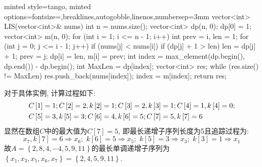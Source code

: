 \documentclass{article}
\begin{document}
\begin{homeworkProblem}
\begin{tcblisting}
{minted style=tango,
minted options={fontsize=\small,breaklines,autogobble,linenos,numbersep=3mm}}
vector<int> LIS(vector<int>& nums) {
    int n = nums.size();
    vector<int> dp(n, 0);
    dp[0] = 1;
    vector<int> m(n, 0); 
    for (int i = 1; i <= n - 1; i++) {
        int prev = i, len = 1; 
        for (int j = 0; j <= i - 1; j++) {
            if (nums[j] < nums[i]) { 
                if (dp[j] + 1 > len) {
                    len = dp[j] + 1;
                    prev = j;
                }
            }
        }
        dp[i] = len, m[i] = prev; 
    }
    int index = max_element(dp.begin(), dp.end()) - dp.begin(); 
    int MaxLen = dp[index]; 
    vector<int> res;
    while (res.size() != MaxLen) {
        res.push_back(nums[index]);
        index = m[index];
    }
    return res;
}
\end{tcblisting}

	对于具体实例, 计算过程如下:
	\begin{align}
		&C\left[ 1 \right] =1; C\left[ 2 \right] =2,k\left[ 2 \right] =1; C\left[ 3 \right] =2,k\left[ 3 \right] =1; C\left[ 4 \right] =1,k\left[ 4 \right] =0; \notag
		\\
		&C\left[ 5 \right] =3, k\left[ 5 \right] =3; C\left[ 6 \right] =4,k\left[ 6 \right] =5; C\left[ 7 \right] =5,k\left[ 7 \right] =6 \notag
	\end{align}
	显然在数组$C$中的最大值为$C[7]=5$, 即最长递增子序列长度为5且追踪过程为: $$x_7,k\left[ 7 \right] =6\Rightarrow x_6;\,\, k\left[ 6 \right] =5\Rightarrow x_5;\,\, k\left[ 5 \right] =3\Rightarrow x_3;\,\, k\left[ 3 \right] =1\Rightarrow x_1
	$$
	故$A=\left\{ 2,8,4,-4,5,9,11 \right\} $的最长单调递增子序列为$\left\{ x_1,x_3,x_5,x_6,x_7 \right\} =\left\{ 2,4,5,9,11 \right\}$.
\end{homeworkProblem}
\end{document}

